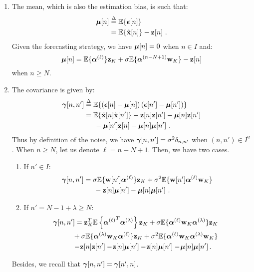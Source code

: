 \begin{enumerate}
\item 
The mean, which is also the estimation bias, is such that: 
\begin{align*}
\boldsymbol{\mu}[n]&\overset{\Delta}{=}{\mathbb E}\{\boldsymbol{\epsilon}[n]\} \\
&={\mathbb E}\{\tilde{{\mathbf x}}[n]\} - {\mathbf z}[n]\ .
\end{align*}
Given the forecasting strategy, we have $\boldsymbol{\mu}[n]=0$ when $n\in I$ and: 
\begin{equation}
\bmu[n]= \EE\{\balpha^{(\ell)}\}\bz_{K} + \sigma\EE\{\balpha^{(n-N+1)}\bw_{K}\} - \bz[n]
\label{eq:bias0}
\end{equation}
when $n\geq N$.
\item 
The covariance is given by:
\begin{align*}
\boldsymbol{\gamma}[n,n'] &\overset{\Delta}{=} {\mathbb E}\{\left(\boldsymbol{\epsilon}[n]-\boldsymbol{\mu}[n]\right)\left(\boldsymbol{\epsilon}[n']-\boldsymbol{\mu}[n']\right)\}\\
&= {\mathbb E}\{\tilde{{\mathbf x}}[n]\tilde{{\mathbf x}}[n']\}-{\mathbf z}[n]{\mathbf z}[n'] -\boldsymbol{\mu}[n]{\mathbf z}[n'] \\
&\hspace{15pt} - \boldsymbol{\mu}[n']{\mathbf z}[n] -\boldsymbol{\mu}[n]\boldsymbol{\mu}[n']\ .
\end{align*}
Thus by definition of the noise, we have $\boldsymbol{\gamma}[n,n'] =\sigma^2\delta_{n,n'}$ when $(n,n')\in I^2$. When $n\geq N$, let us denote $\ell=n-N+1$. Then, we have two cases.
\begin{enumerate}[label=(\roman*)]
\item If $n'\in I$:
\begin{align}
\nonumber
\bgamma[n,n'] &= \sigma\EE\{\bw[n']\balpha^{(\ell)}\}\bz_K + \sigma^2\EE\{\bw[n']\balpha^{(\ell)}\bw_K\} \\
&\hspace{15pt} -\bz[n]\bmu[n'] - \bmu[n]\bmu[n']\ .
\label{eq:cov00}
\end{align}
\item If $n'=N-1+\lambda\geq N$:
\begin{align}
\nonumber
\hspace{-6pt}\bgamma[n,n'] &= \bz_K^T\EE\left\{{\balpha^{(\ell)}}^T\balpha^{(\lambda)}\right\}\bz_K + \sigma\EE\{\balpha^{(\ell)}\bw_K\balpha^{(\lambda)}\}\bz_K \\
\nonumber
&\hspace{-3pt} + \sigma\EE\{\balpha^{(\lambda)}\bw_K\balpha^{(\ell)}\}\bz_K + \sigma^2\EE\{\balpha^{(\ell)}\bw_K\balpha^{(\lambda)}\bw_K\}  \\
&\hspace{-3pt} -\!\bz[n]\bz[n']-\!\bz[n]\bmu[n']-\!\bz[n]\bmu[n'] -\! \bmu[n]\bmu[n']\,.
\label{eq:cov01}
\end{align}
\end{enumerate}
Besides, we recall that $\boldsymbol{\gamma}[n,n']=\boldsymbol{\gamma}[n',n]$.
\end{enumerate}

